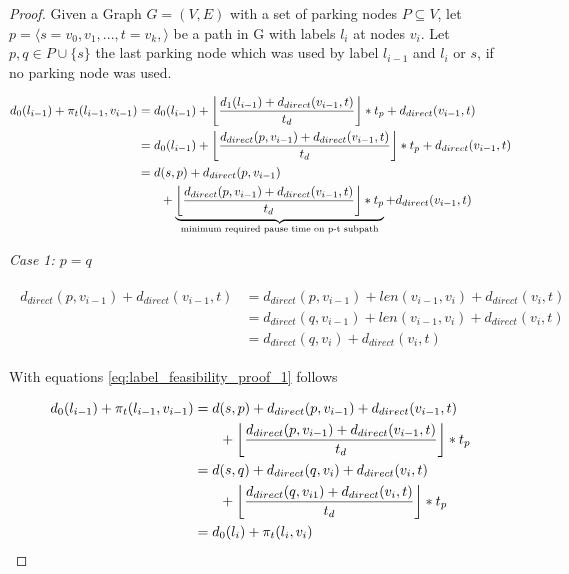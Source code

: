 \begin{proof}
	Given a Graph $G=(V,E)$ with a set of parking nodes $P \subseteq V$, let $p = \langle s=v_0,v_1,...,t=v_k, \rangle$ be a path in G with labels $l_i$ at nodes $v_i$. Let $p,q \in P \cup \{s\}$ the last parking node which was used by label $l_{i-1}$ and $l_{i}$ or $s$, if no parking node was used.

	\begin{align}
		\begin{split}\label{eq:label_feasibility_proof_1}
			d_0(l_{i-1}) + \pi_t(l_{i-1},v_{i-1}) &= d_0(l_{i-1})+\floor*{ \frac{d_1(l_{i-1}) + d_{direct}(v_{i-1},t)}{t_d} } * t_p + d_{direct}(v_{i-1},t)\\
			&= d_0(l_{i-1})+ \floor*{ \frac{d_{direct}(p,v_{i-1}) + d_{direct}(v_{i-1},t)}{t_d} } * t_p + d_{direct}(v_{i-1},t)\\
			&=d(s,p) + d_{direct}(p,v_{i-1})\\
			& \phantom{{}=1} + \underbrace{\floor*{ \frac{d_{direct}(p,v_{i-1}) + d_{direct}(v_{i-1},t)}{t_d} } * t_p}_\text{minimum required pause time on p-t subpath} + d_{direct}(v_{i-1},t)
		\end{split}
	\end{align}

	\emph{Case 1: $p=q$}

	\begin{align}
		\begin{split}\label{eq:label_feasibility_proof_2}
			d_{direct}(p,v_{i-1}) + d_{direct}(v_{i-1},t) & = d_{direct}(p,v_{i-1}) + len(v_{i-1},v_i) + d_{direct}(v_i,t) \\
			& = d_{direct}(q,v_{i-1}) + len(v_{i-1},v_i) + d_{direct}(v_i,t) \\
			& = d_{direct}(q,v_i) + d_{direct}(v_i,t)
		\end{split}
	\end{align}

	With equations \ref{eq:label_feasibility_proof_1} follows

	\begin{align}
		\begin{split}\label{eq:label_feasibility_proof_3}
			d_0(l_{i-1}) + \pi_t(l_{i-1},v_{i-1}) &= d(s,p) + d_{direct}(p,v_{i-1}) + d_{direct}(v_{i-1},t)\\
			& \phantom{{}=1} + \floor*{ \frac{d_{direct}(p,v_{i-1}) + d_{direct}(v_{i-1},t)}{t_d} } * t_p\\
			&= d(s,q) + d_{direct}(q,v_{i}) + d_{direct}(v_{i},t)\\
			& \phantom{{}=1} + \floor*{ \frac{d_{direct}(q,v_{i1}) + d_{direct}(v_{i},t)}{t_d} } * t_p\\
			&= d_0(l_{i}) + \pi_t(l_{i},v_{i})
		\end{split}
	\end{align}


\end{proof}
